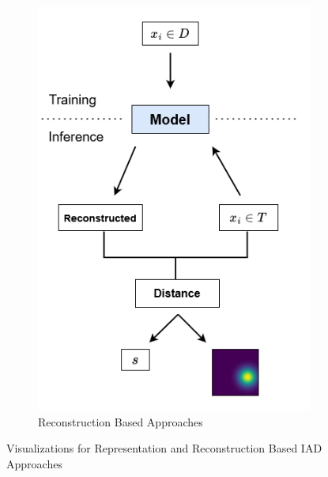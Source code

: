 \begin{figure}
\begin{subfigure}[b]{0.44\textwidth}
        \includegraphics[width=\textwidth]{figures/rec_based.png}
        \caption{Reconstruction Based Approaches}
        \label{subfig:recbased}
    \end{subfigure}
    \caption{Visualizations for Representation and Reconstruction Based IAD Approaches}
    \label{fig:vizofrecrepbased}
\end{figure}
